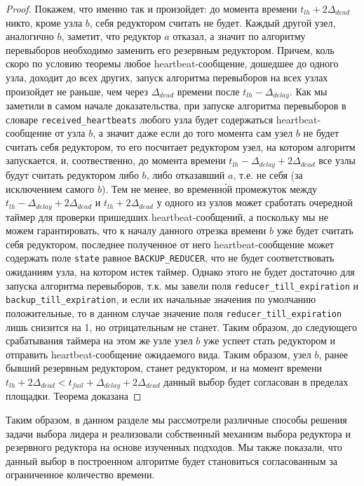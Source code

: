 \documentclass{article}
\theoremstyle{plain}
\theoremstyle{plain}
\theoremstyle{plain}
\theoremstyle{plain}
\theoremstyle{definition}
\theoremstyle{remark}
\theoremstyle{plain}
\begin{document}
\begin{proof}
    Покажем, что именно так и произойдет: до момента времени $t_{lh} + 2\Delta_{dead}$ никто, кроме узла $b$, себя редуктором считать не будет. Каждый другой узел, аналогично $b$, заметит, что редуктор $a$ отказал, а значит по алгоритму перевыборов необходимо заменить его резервным редуктором. Причем, коль скоро по условию теоремы любое heartbeat-со\-об\-ще\-ние, дошедшее до одного узла, доходит до всех других, запуск алгоритма перевыборов на всех узлах произойдет не раньше, чем через $\Delta_{dead}$ времени после $t_{lh} - \Delta_{delay}$. Как мы заметили в самом начале доказательства, при запуске алгоритма перевыборов в словаре \texttt{received\_heartbeats} любого узла будет содержаться heartbeat-со\-об\-ще\-ние от узла $b$, а значит даже если до того момента сам узел $b$ не будет считать себя редуктором, то его посчитает редуктором узел, на котором алгоритм запускается, и, соотвественно, до момента времени $t_{lh} - \Delta_{delay} + 2\Delta_{dead}$ все узлы будут считать редуктором либо $b$, либо отказавший $a$, т.е. не себя (за исключением самого $b$). Тем не менее, во временн\'{о}й промежуток между $t_{lh} - \Delta_{delay} + 2\Delta_{dead}$ и $t_{lh} + 2\Delta_{dead}$ у одного из узлов может сработать очередной таймер для проверки пришедших heartbeat-со\-об\-ще\-ний, а поскольку мы не можем гарантировать, что к началу данного отрезка времени $b$ уже будет считать себя редуктором, последнее полученное от него heartbeat-со\-об\-ще\-ние может содержать поле \texttt{state} равное \texttt{BACKUP\_REDUCER}, что не будет соответствовать ожиданиям узла, на котором истек таймер. Однако этого не будет достаточно для запуска алгоритма перевыборов, т.к. мы завели поля \texttt{reducer\_till\_expiration} и \texttt{backup\_till\_expiration}, и если их начальные значения по умолчанию положительные, то в данном случае значение поля \texttt{reducer\_till\_expiration} лишь снизится на 1, но отрицательным не станет. Таким образом, до следующего срабатывания таймера на этом же узле узел $b$ уже успеет стать редуктором и отправить heartbeat-со\-об\-ще\-ние ожидаемого вида. Таким образом, узел $b$, ранее бывший резервным редуктором, станет редуктором, и на момент времени $t_{lh} + 2\Delta_{dead} < t_{fail} + \Delta_{delay} + 2\Delta_{dead}$ данный выбор будет согласован в пределах площадки. Теорема доказана
\end{proof}

Таким образом, в данном разделе мы рассмотрели различные способы решения задачи выбора лидера и реализовали собственный механизм выбора редуктора и резервного редуктора на основе изученных подходов. Мы также показали, что данный выбор в построенном алгоритме будет становиться согласованным за ограниченное количество времени.
\end{document}

